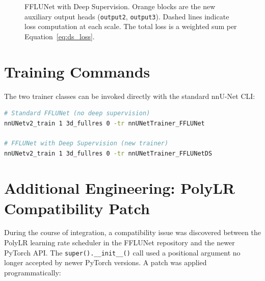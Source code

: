\documentclass[12pt,a4paper]{report}
\begin{document}
\begin{figure}[H]
\caption{FFLUNet with Deep Supervision. Orange blocks are the new auxiliary output heads (\texttt{output2}, \texttt{output3}). Dashed lines indicate loss computation at each scale. The total loss is a weighted sum per Equation~\ref{eq:ds_loss}.}
\label{fig:fflunet_ds}
\end{figure}

\section{Training Commands}

The two trainer classes can be invoked directly with the standard nnU-Net CLI:

\begin{lstlisting}[language=bash, caption={Training commands for standard FFLUNet and FFLUNet-DS}]
# Standard FFLUNet (no deep supervision)
nnUNetv2_train 1 3d_fullres 0 -tr nnUNetTrainer_FFLUNet

# FFLUNet with Deep Supervision (new trainer)
nnUNetv2_train 1 3d_fullres 0 -tr nnUNetTrainer_FFLUNetDS
\end{lstlisting}

\section{Additional Engineering: PolyLR Compatibility Patch}

During the course of integration, a compatibility issue was discovered between the PolyLR learning rate scheduler in the FFLUNet repository and the newer PyTorch API. The \texttt{super().\_\_init\_\_()} call used a positional argument no longer accepted by newer PyTorch versions. A patch was applied programmatically:
\end{document}
